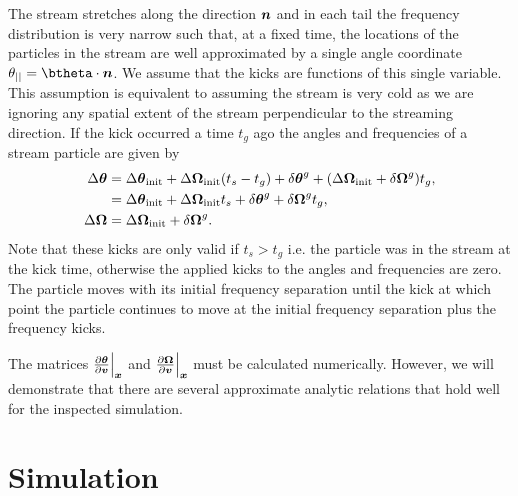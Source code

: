 \documentclass[useAMS,usenatbib,fleqn,a4paper]{mn2e}
\newcommand{\bs}[1]{\bmath{#1}}
\begin{document}
The stream stretches along the direction $\bs{n}$ and in each tail the frequency distribution is very narrow such that, at a fixed time, the locations of the particles in the stream are well approximated by a single angle coordinate $\theta_{||}=\btheta\cdot\bs{n}$. We assume that the kicks are functions of this single variable. This assumption is equivalent to assuming the stream is very cold as we are ignoring any spatial extent of the stream perpendicular to the streaming direction. If the kick occurred a time $t_g$ ago the angles and frequencies of a stream particle are given by
\begin{equation}\label{linearkickevol}
\begin{split}
\Delta\bs{\theta} &= \Delta\bs{\theta}_{\rm init}+\Delta\boldsymbol{\Omega}_{\rm init}(t_s-t_g)+\delta\bs{\theta}^g+(\Delta\boldsymbol{\Omega}_{\rm init}+\delta\boldsymbol{\Omega}^g)t_g , \\&= \Delta\bs{\theta}_{\rm init}+\Delta\boldsymbol{\Omega}_{\rm init}t_s+\delta\bs{\theta}^g+\delta\boldsymbol{\Omega}^g t_g,\\
\Delta\boldsymbol{\Omega} &= \Delta\boldsymbol{\Omega}_{\rm init}+\delta\boldsymbol{\Omega}^g.
\end{split}
\end{equation}
Note that these kicks are only valid if $t_s>t_g$ i.e. the particle was in the stream at the kick time, otherwise the applied kicks to the angles and frequencies are zero.
The particle moves with its initial frequency separation until the kick at which point the particle continues to move at the initial frequency separation plus the frequency kicks.

The matrices $\frac{\upartial \bs{\theta}}{\upartial \bs{v}}\Big|_{\bs{x}}$ and $\frac{\upartial \bs{\Omega}}{\upartial \bs{v}}\Big|_{\bs{x}}$ must be calculated numerically. However, we will demonstrate that there are several approximate analytic relations that hold well for the inspected simulation.

\section{Simulation}\label{Sect::Simulation}
\end{document}

